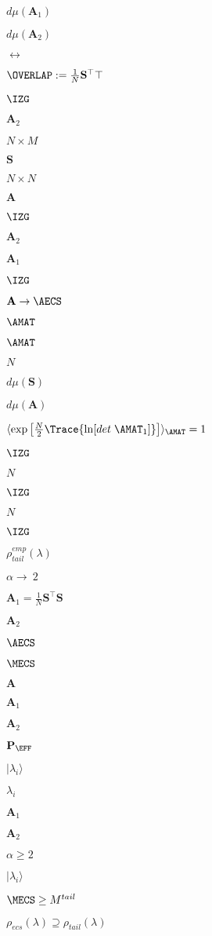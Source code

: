 $d\mu(\mathbf{A}_{1})$

$d\mu(\mathbf{A}_{2})$

$\leftrightarrow$

$\OVERLAP := \tfrac{1}{N}\mathbf{S}^{\top}\mathbf{\top}$

$\IZG$

$\mathbf{A}_{2}$

$N\times M$

$\mathbf{S}$

$N\times N$

$\mathbf{A}$

$\IZG$

$\mathbf{A}_{2}$

$\mathbf{A}_{1}$

$\IZG$

$\mathbf{A}\rightarrow\AECS$

$\AMAT$

$\AMAT$

$N$

$d\mu(\mathbf{S})$

$d\mu(\mathbf{A})$

$\langle \exp\left[\tfrac{N}{2} \Trace{ \ln[det\;\AMAT_{1}] } \right]\rangle_{\AMAT}=1$

$\IZG$

$N$

$\IZG$

$N$

$\IZG$

$\rho_{tail}^{emp}(\lambda)$

$\alpha\rightarrow\ 2$

$\mathbf{A}_{1}=\tfrac{1}{N}\mathbf{S}^{\top}\mathbf{S}$

$\mathbf{A}_{2}$

$\AECS$

$\MECS$

$\mathbf{A}$

$\mathbf{A}_{1}$

$\mathbf{A}_{2}$

$\mathbf{P}_{\EFF}$

$|\lambda_{i}\rangle$

$\lambda_{i}$

$\mathbf{A}_{1}$

$\mathbf{A}_{2}$

$\alpha\ge 2$

$|\lambda_{i}\rangle$

$\MECS\ge M^{tail}$

$\rho_{ecs}(\lambda)\supseteq\rho_{tail}(\lambda)$

